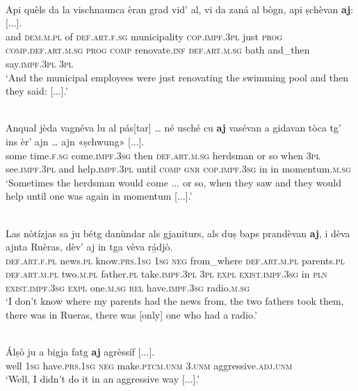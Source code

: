 \ea
\label{ex:aj:5}
\\
\gll  Api quèls da la vischnaunca èran grad vid' al, vi da zaná al bògn, api ṣchèvan \textbf{aj}: [...]. \\
and \textsc{dem.m.pl} of \textsc{def.art.f.sg} municipality \textsc{cop.impf.3pl} just \textsc{prog} \textsc{comp.def.art.m.sg} \textsc{prog} \textsc{comp} renovate.\textsc{inf} \textsc{def.art.m.sg} bath and\_then say.\textsc{impf.3pl} \textsc{3pl} \\
\glt `And the municipal employees were just renovating the swimming pool and then they said: [...].'
\z

\ea
\label{ex:aj:7}
\\
\gll  Anqual jèda vagnéva lu al pás[tar] … né usché cu \textbf{aj} vasévan a gidavan tòca tg’ ins èr’ ajn … ajn «ṣchwung»\footnotemark{} [...].\\
some time.\textsc{f.sg} come.\textsc{impf.3sg} then \textsc{def.art.m.sg} herdsman {} or so when \textsc{3pl} see.\textsc{impf.3pl} and help.\textsc{impf.3pl} until \textsc{comp} \textsc{gnr} \textsc{cop.impf.3sg} in {} in momentum.\textsc{m.sg}\\
\glt `Sometimes the herdsman would come ... or so, when they saw and they would help until one was again in momentum [...].'
\z

\ea
\label{ex:aj:6}
\\
\gll    Las nòtízjas sa ju bétg danùndar als gjaniturs, als duṣ baps prandèvan \textbf{aj}, i dèva ajnta Ruèras, dèv’ aj in tga vèva rá̱djò.\\
\textsc{def.art.f.pl} news.\textsc{pl} know.\textsc{prs.1sg} \textsc{1sg} \textsc{neg} from\_where \textsc{def.art.m.pl} parents.\textsc{pl} \textsc{def.art.m.pl} two.\textsc{m.pl} father.\textsc{pl} take.\textsc{impf.3pl} \textsc{3pl} \textsc{expl} \textsc{exist.impf.3sg} in \textsc{pln} \textsc{exist.impf.3sg} \textsc{expl}  one.\textsc{m.sg} \textsc{rel} have.\textsc{impf.3sg} radio.\textsc{m.sg} \ \\
\glt `I don’t know where my parents had the news from, the two fathers took them, there was in Rueras, there was [only] one who had a radio.'
\z

\ea
\label{ex:aj:8}
\\
\gll  Álṣò ju a bigja fatg \textbf{aj} agrèssíf [...].\\
well \textsc{1sg} have.\textsc{prs.1sg} \textsc{neg} make.\textsc{ptcm.unm} \textsc{3.unm} aggressive.\textsc{adj.unm}\\
\glt `Well, I didn’t do it in an aggressive way [...].'
\z

